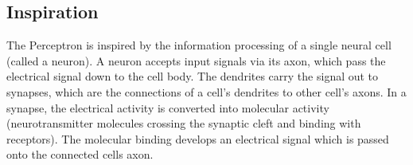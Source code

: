 \subsection{Inspiration}
The Perceptron is inspired by the information processing of a single neural cell (called a neuron). 
A neuron accepts input signals via its axon, which pass the electrical signal down to the cell body. The dendrites carry the signal out to synapses, which are the connections of a cell's dendrites to other cell's axons. In a synapse, the electrical activity is converted into molecular activity (neurotransmitter molecules crossing the synaptic cleft and binding with receptors). The molecular binding develops an electrical signal which is passed onto the connected cells axon.


